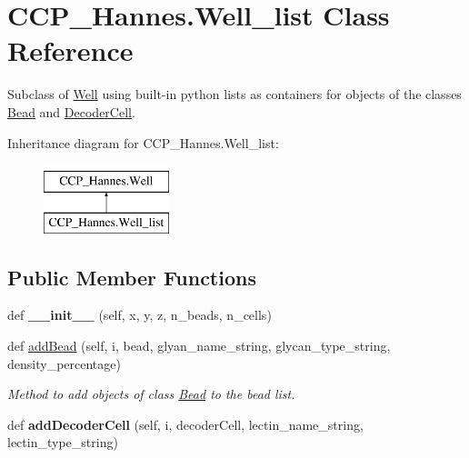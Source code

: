 \hypertarget{class_c_c_p___hannes_1_1_well__list}{}\section{C\+C\+P\+\_\+\+Hannes.\+Well\+\_\+list Class Reference}
\label{class_c_c_p___hannes_1_1_well__list}


Subclass of \mbox{\hyperlink{class_c_c_p___hannes_1_1_well}{Well}} using built-\/in python lists as containers for objects of the classes \mbox{\hyperlink{class_c_c_p___hannes_1_1_bead}{Bead}} and \mbox{\hyperlink{class_c_c_p___hannes_1_1_decoder_cell}{Decoder\+Cell}}.  


Inheritance diagram for C\+C\+P\+\_\+\+Hannes.\+Well\+\_\+list\+:\begin{figure}[H]
\begin{center}
\leavevmode
\includegraphics[height=2.000000cm]{class_c_c_p___hannes_1_1_well__list}
\end{center}
\end{figure}
\subsection*{Public Member Functions}
\begin{DoxyCompactItemize}
\item 
\mbox{\label{class_c_c_p___hannes_1_1_well__list_a933f4992003c4596f01e5d6eb073dd98}} 
def {\bfseries \+\_\+\+\_\+init\+\_\+\+\_\+} (self, x, y, z, n\+\_\+beads, n\+\_\+cells)
\item 
def \mbox{\hyperlink{class_c_c_p___hannes_1_1_well__list_ae4a512caba0dd7137b6ad4196cf72c1d}{add\+Bead}} (self, i, bead, glyan\+\_\+name\+\_\+string, glycan\+\_\+type\+\_\+string, density\+\_\+percentage)
\begin{DoxyCompactList}\small\item\em Method to add objects of class \mbox{\hyperlink{class_c_c_p___hannes_1_1_bead}{Bead}} to the bead list. \end{DoxyCompactList}\item 
\mbox{\label{class_c_c_p___hannes_1_1_well__list_a5c1b28836c28ddea4d2cc808f4d1d266}} 
def {\bfseries add\+Decoder\+Cell} (self, i, decoder\+Cell, lectin\+\_\+name\+\_\+string, lectin\+\_\+type\+\_\+string)
\end{DoxyCompactItemize}
